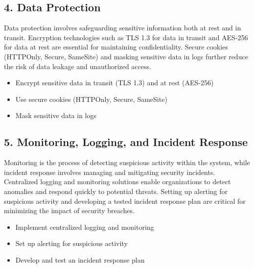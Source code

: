 \subsection*{4. Data Protection}
Data protection involves safeguarding sensitive information both at rest and in transit\cite{nist800154}. Encryption technologies such as TLS 1.3 for data in transit and AES-256 for data at rest are essential for maintaining confidentiality. Secure cookies (HTTPOnly, Secure, SameSite) and masking sensitive data in logs further reduce the risk of data leakage and unauthorized access.
\begin{itemize}
	\item Encrypt sensitive data in transit (TLS 1.3) and at rest (AES-256)
	\item Use secure cookies (HTTPOnly, Secure, SameSite)
	\item Mask sensitive data in logs
\end{itemize}

\subsection*{5. Monitoring, Logging, and Incident Response}
Monitoring is the process of detecting suspicious activity within the system, while incident response involves managing and mitigating security incidents\cite{uceda2015}. Centralized logging and monitoring solutions enable organizations to detect anomalies and respond quickly to potential threats. Setting up alerting for suspicious activity and developing a tested incident response plan are critical for minimizing the impact of security breaches.
\begin{itemize}
	\item Implement centralized logging and monitoring
	\item Set up alerting for suspicious activity
	\item Develop and test an incident response plan
\end{itemize}

